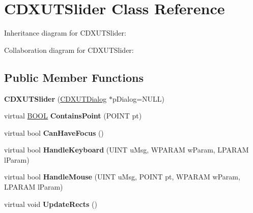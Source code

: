 \hypertarget{class_c_d_x_u_t_slider}{\section{C\+D\+X\+U\+T\+Slider Class Reference}
\label{class_c_d_x_u_t_slider}
}


Inheritance diagram for C\+D\+X\+U\+T\+Slider\+:


Collaboration diagram for C\+D\+X\+U\+T\+Slider\+:
\subsection*{Public Member Functions}
\begin{DoxyCompactItemize}
\item 
\hypertarget{class_c_d_x_u_t_slider_ae7a6fff7f9d0e05058b980e952e4bd7b}{{\bfseries C\+D\+X\+U\+T\+Slider} (\hyperlink{class_c_d_x_u_t_dialog}{C\+D\+X\+U\+T\+Dialog} $\ast$p\+Dialog=N\+U\+L\+L)}\label{class_c_d_x_u_t_slider_ae7a6fff7f9d0e05058b980e952e4bd7b}

\item 
\hypertarget{class_c_d_x_u_t_slider_a8c3b16c9ae0c7aa68797f58aced30d16}{virtual \hyperlink{_ice_types_8h_a050c65e107f0c828f856a231f4b4e788}{B\+O\+O\+L} {\bfseries Contains\+Point} (P\+O\+I\+N\+T pt)}\label{class_c_d_x_u_t_slider_a8c3b16c9ae0c7aa68797f58aced30d16}

\item 
\hypertarget{class_c_d_x_u_t_slider_afbda40a898fbc1424759bc530899475d}{virtual bool {\bfseries Can\+Have\+Focus} ()}\label{class_c_d_x_u_t_slider_afbda40a898fbc1424759bc530899475d}

\item 
\hypertarget{class_c_d_x_u_t_slider_a964f84282a049232a0620eaa58242fd2}{virtual bool {\bfseries Handle\+Keyboard} (U\+I\+N\+T u\+Msg, W\+P\+A\+R\+A\+M w\+Param, L\+P\+A\+R\+A\+M l\+Param)}\label{class_c_d_x_u_t_slider_a964f84282a049232a0620eaa58242fd2}

\item 
\hypertarget{class_c_d_x_u_t_slider_a20c8e1a621cc1a18f0535f5fd4bbd273}{virtual bool {\bfseries Handle\+Mouse} (U\+I\+N\+T u\+Msg, P\+O\+I\+N\+T pt, W\+P\+A\+R\+A\+M w\+Param, L\+P\+A\+R\+A\+M l\+Param)}\label{class_c_d_x_u_t_slider_a20c8e1a621cc1a18f0535f5fd4bbd273}

\item 
\hypertarget{class_c_d_x_u_t_slider_a091410aa578fc041b84e4173a969df58}{virtual void {\bfseries Update\+Rects} ()}\label{class_c_d_x_u_t_slider_a091410aa578fc041b84e4173a969df58}


\end{DoxyCompactItemize}
